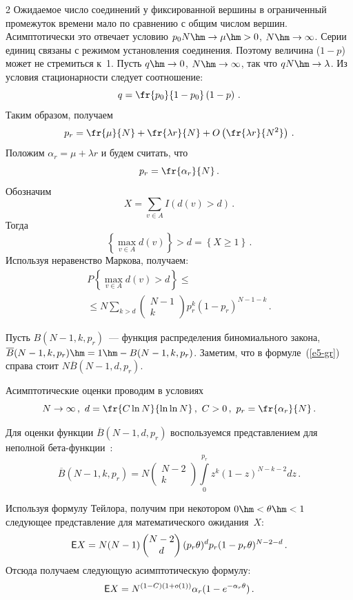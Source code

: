 \begin{multicols}{2}
     Ожидаемое число соединений у фиксированной вершины в ограниченный 
промежуток времени мало по сравнению с общим числом вершин. Асимптотически это 
отвечает условию $p_0 N\hm\rightarrow \mu\hm>0$, $N\hm\rightarrow\infty$. Серии единиц 
связаны с режимом установления соединения. Поэтому величина ($1-p$) может не 
стремиться к~1. Пусть $q\hm\rightarrow 0$, $N\hm\rightarrow\infty$, так что 
$qN\hm\rightarrow\lambda$. Из условия стационарности следует соотношение:
     $$
     q=\fr{p_0}{1-p_0}\left( 1-p\right)\,.
     $$
Таким образом, получаем
$$
p_r=\fr{\mu}{N}+\fr{\lambda r}{N}+O\left( \fr{\lambda r}{N^2}\right)\,.
$$
Положим $\alpha_r=\mu+\lambda r$ и будем считать, что
$$
p_r=\fr{\alpha_r}{N}\,.
$$
Обозначим 
$$
X=\sum\limits_{v\in A} I(d(v)>d)\,.
$$
Тогда 
$$
\left\{ \max\limits_{v\in A} d(v)\right\} >d =\left\{ X\geq 1\right\}\,.
$$
Используя неравенство Маркова, получаем:
\begin{multline}
P\left\{ \max\limits_{v\in A} d(v)>d\right\} \leq{}\\
{}\leq N\sum\limits_{k>d}\begin{pmatrix}
N-1\\ k\end{pmatrix} p_r^k(1-p_r)^{N-1-k}\,.
\label{e5-gr}
\end{multline}
     
     Пусть $B(N-1, k, p_r)$~--- функция распределения биномиального закона, 
$\overline{B}(N-1, k, p_r)\hm=1 \hm- B(N-1, k, p_r)$. Заметим, что в формуле~(\ref{e5-gr}) 
справа стоит $N\overline{B} (N-1, d, p_r)$. 
     
     Асимптотические оценки проводим в условиях
     $$
     N\rightarrow\infty\,, \ d=\fr{C\ln N}{\ln\ln N}\,,\ C>0\,,\ p_r=\fr{\alpha_r}{N}\,.
     $$
     
     Для оценки функции $\overline{B} (N-1, d, p_r)$ воспользуемся представлением для 
неполной бе\-та-функ\-ции~\cite{14-gr}:
     $$
     \overline{B}(N-1,k,p_r)=N\begin{pmatrix}
     N-2\\ k \end{pmatrix} \int\limits_0^{p_r} z^k (1-z)^{N-k-2}dz\,.
     $$
     
     Используя формулу Тейлора, получим при некотором $0\hm<\theta\hm<1$ 
следующее представление для математического ожидания~$X$:
     $$
     {\sf E}X=N(N-1)\begin{pmatrix}
     N-2\\ d\end{pmatrix} (p_r\theta)^d p_r(1-p_r\theta)^{N-2-d}\,.
     $$
Отсюда получаем следующую асимптотическую формулу:
\begin{equation}
{\sf E}X=N^{(1-C)(1+o(1))}\alpha_r(1-e^{-\alpha_r\theta})\,.
\label{e6-gr}
     \end{equation}
     

\end{multicols}
